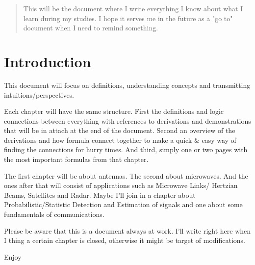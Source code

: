 

\begin{abstract}
    This will be the document where I write everything I know about what I learn during my studies.
    I hope it serves me in the future as a "go to" document when I need to remind something.
\end{abstract}

\section*{\hfil Introduction \hfil}\label{intro}
\par This document will focus on definitions, understanding concepts and transmitting intuitions/perspectives. 
\par Each chapter will have the same structure. First the definitions and logic connections between everything with references to derivations and demonstrations that will be in attach at the end of the document. Second an overview of the derivations and how formula connect together to make a quick \& easy way of finding the connections for hurry times.
And third, simply one or two pages with the most important formulas from that chapter.
\par The first chapter will be about antennas. The second about microwaves. And the ones after that will consist of applications such as Microwave Links/ Hertzian Beams, Satellites and Radar. Maybe I'll join in a chapter about Probabilistic/Statistic Detection and Estimation of signals and one about some fundamentals of communications.
\par Please be aware that this is a document always at work. I'll write right here when I thing a certain chapter is closed, otherwise it might be target of modifications.
\vspace{1cm}
\begin{center}
    Enjoy
\end{center}





